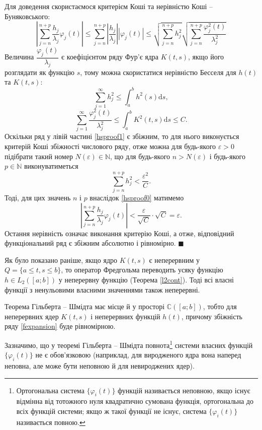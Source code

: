 \documentclass[14pt,twoside]{extreport}
\theoremstyle{mystyle}
\renewenvironment{proof}{{\bfseries Доведення.}}{$\blacksquare$}
\numberwithin{equation}{chapter}
\newcommand{\cab}{\mathbb{C}([a; b])}
\begin{document}
\begin{proof}
 Для доведення скористаємося критерієм Коші та нерівністю Коші --Буняковського:
 \begin{equation}\label{hsproof0}
  \left|\sum_{j=n}^{n+p} \frac{h_j}{\lambda_j} \varphi_j(t)\right| \leqslant \sum_{j=n}^{n+p} \left|\frac{h_j}{\lambda_j}\right| |\varphi_j(t)| \leqslant \sqrt{\sum_{j=n}^{n+p} h_j^2}\sqrt{\sum_{j=n}^{n+p} \dfrac{\varphi_j^2(t)}{\lambda_j^2}}
 \end{equation}
Величина $\dfrac{\varphi_j(t)}{\lambda_j}$ є коефіцієнтом ряду Фур'є ядра $K(t,s)$, якщо його розглядати як функцію $s$, тому можна скористатися нерівністю Бесселя для $h(t)$ та $K(t,s)$:
\begin{equation}\label{hsproof1}
 \sum_{j=1}^{\infty}h_j^2 \leqslant \int_{a}^{b} h^2(s) \mathrm{d}s,
\end{equation}
\begin{equation}\label{hsproof2}
 \sum_{j=1}^{\infty} \dfrac{\varphi_j^2(t)}{\lambda_j^2} \leqslant \int_{a}^{b} K^2(t,s) \mathrm{d}s \leqslant C.
\end{equation}
Оскільки ряд у лівій частині \eqref{hsproof1} є збіжним, то для нього виконується критерій Коші збіжності числового ряду, отже можна для будь-якого $\varepsilon>0$ підібрати такий номер $N(\varepsilon) \in \mathbb{N}$, що для будь-якого $n>N(\varepsilon)$ і будь-якого $p\in\mathbb{N}$ виконуватиметься
\[
 \sum_{j=n}^{n+p} h_j^2 < \dfrac{\varepsilon^2}{C}.
\]
Тоді, для цих значень $n$ і $p$ внаслідок \eqref{hsproof0} матимемо
\[
 \left|\sum_{j=n}^{n+p} \frac{h_j}{\lambda_j} \varphi_j(t)\right| < \dfrac{\varepsilon}{\sqrt{C}}\cdot\sqrt{C} = \varepsilon.
\]
Остання нерівність означає виконання критерію Коші, а отже, відповідний функціональний ряд є збіжним абсолютно і рівномірно.
\end{proof}

Як було показано раніше, якщо ядро $K(t, s)$ є неперервним у $Q=\{a \leqslant t, s \leqslant b\}$, то оператор Фредгольма переводить усяку функцію $h\in L_2([a; b])$ у неперервну функцію (Теорема \ref{l2cont}). Тоді всі власні функції з ненульовими власними значеннями також неперервні.

Теорема Гільберта -- Шмідта має місце й у просторі $\cab$, тобто для неперервних ядер $K(t, s)$ і неперервних функцій $h(t)$, причому збіжність ряду \eqref{fexpansion} буде рівномірною.

Зазначимо, що у теоремі Гільберта -- Шмідта повнота\footnote{Ортогональна система $\{\varphi_i(t)\}$ функцій називається неповною, якщо існує відмінна від тотожного нуля квадратично сумована функція, ортогональна до всіх функцій системи; якщо ж такої функції не існує, система $\{\varphi_i(t)\}$ називається повною.} системи власних функцій $\{\varphi_i(t)\}$ не є обов'язковою (наприклад, для виродженого ядра вона наперед неповна, але може бути неповною й для невироджених ядер).
\end{document}

